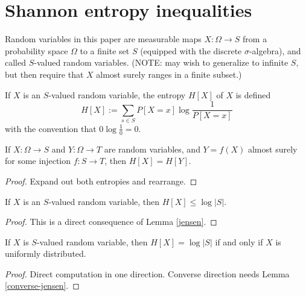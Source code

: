 \chapter{Shannon entropy inequalities}

Random variables in this paper are measurable maps $X : \Omega \to S$ from a probability space $\Omega$ to a finite set $S$ (equipped with the discrete $\sigma$-algebra), and called $S$-valued random variables.
(NOTE: may wish to generalize to infinite $S$, but then require that $X$ almost surely ranges in a finite subset.)

\begin{definition}[Entropy]
  \label{entropy-def}
  \leanok
  If $X$ is an $S$-valued random variable, the entropy $H[X]$ of $X$ is defined
  $$ H[X] := \sum_{s \in S} P[X=x] \log \frac{1}{P[X=x]}$$
  with the convention that $0 \log \frac{1}{0} = 0$.
\end{definition}

\begin{lemma}\label{relabeled-entropy} 
  If $X: \Omega \to S$ and $Y: \Omega \to T$ are random variables, and $Y = f(X)$ almost surely for some injection $f: S \to T$, then $H[X] = H[Y]$.
\end{lemma}

\begin{proof} \leanok Expand out both entropies and rearrange.
\end{proof}

\begin{lemma}\label{jensen-bound}
  \leanok
  If $X$ is an $S$-valued random variable, then $H[X] \leq \log |S|$.
\end{lemma}

\begin{proof}\leanok
  This is a direct consequence of Lemma \ref{jensen}.
\end{proof}

\begin{lemma}\label{uniform-entropy}
  \leanok
  If $X$ is $S$-valued random variable, then $H[X] = \log |S|$ if and only if $X$ is uniformly distributed.
\end{lemma}

\begin{proof}  Direct computation in one direction.  Converse direction needs Lemma \ref{converse-jensen}.
\end{proof}

